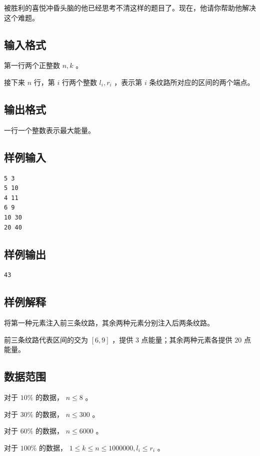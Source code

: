 \documentclass[12pt]{article}
\begin{document}
被胜利的喜悦冲昏头脑的他已经思考不清这样的题目了。现在，他请你帮助他解决这个难题。

\subsection{输入格式}

第一行两个正整数 $n,k$ 。

接下来 $n$ 行，第 $i$ 行两个整数 $l_i,r_i$ ，表示第 $i$ 条纹路所对应的区间的两个端点。

\subsection{输出格式}

一行一个整数表示最大能量。

\subsection{样例输入}

\begin{verbatim}
5 3
5 10
4 11
6 9
10 30
20 40
\end{verbatim}

\subsection{样例输出}

\begin{verbatim}
43
\end{verbatim}

\subsection{样例解释}

将第一种元素注入前三条纹路，其余两种元素分别注入后两条纹路。

前三条纹路代表区间的交为 $[6,9]$ ，提供 $3$ 点能量；其余两种元素各提供 $20$ 点能量。

\subsection{数据范围}

对于 $10\%$ 的数据， $n\le 8$ 。

对于 $30\%$ 的数据， $n\le 300$ 。

对于 $60\%$ 的数据， $n\le 6000$ 。

对于 $100\%$ 的数据， $1\le k\le n\le 1000000,l_i\le r_i$ 。
\end{document}
